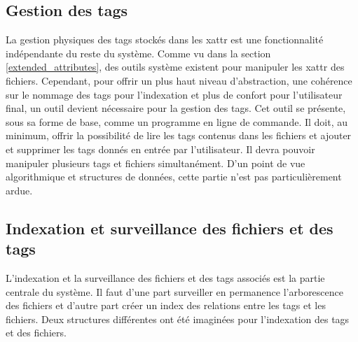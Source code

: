 \documentclass[a4paper, 12pt]{article}
\begin{document}
\subsection{Gestion des tags}
La gestion physiques des tags stockés dans les \acrshort{xattr} est une fonctionnalité indépendante du 
reste du système. Comme vu dans la section \ref{extended_attributes}, des outils système existent pour 
manipuler les \acrshort{xattr} des fichiers. Cependant, pour offrir un plus haut niveau d'abstraction, 
une cohérence sur le nommage des tags pour l'indexation et plus de confort pour l'utilisateur final, 
un outil devient nécessaire pour la gestion des tags. Cet outil se présente, sous sa forme de base, 
comme un programme en ligne de commande. Il doit, au minimum, offrir la possibilité de lire les tags 
contenus dans les fichiers et ajouter et supprimer les tags donnés en entrée par l'utilisateur. 
Il devra pouvoir manipuler plusieurs tags et fichiers simultanément. D'un point de vue algorithmique 
et structures de données, cette partie n'est pas particulièrement ardue.

\subsection{Indexation et surveillance des fichiers et des tags}
L'indexation et la surveillance des fichiers et des tags associés est la partie centrale du système. 
Il faut d'une part surveiller en permanence l'arborescence des fichiers et d'autre part créer un 
index des relations entre les tags et les fichiers. Deux structures différentes ont été imaginées 
pour l'indexation des tags et des fichiers.
\end{document}
